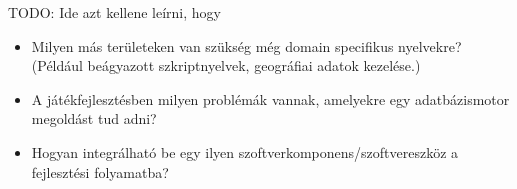 
TODO: Ide azt kellene leírni, hogy
\begin{itemize}
\item Milyen más területeken van szükség még domain specifikus nyelvekre? (Például beágyazott szkriptnyelvek, geográfiai adatok kezelése.)
\item A játékfejlesztésben milyen problémák vannak, amelyekre egy adatbázismotor megoldást tud adni?
\item Hogyan integrálható be egy ilyen szoftverkomponens/szoftvereszköz a fejlesztési folyamatba?
\end{itemize}